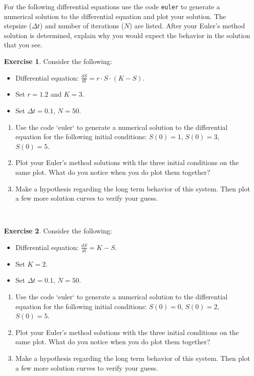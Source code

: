 \documentclass[
]{book}
\theoremstyle{definition}
\theoremstyle{definition}
\theoremstyle{definition}
\newtheorem{exercise}{Exercise}[chapter]
\theoremstyle{remark}
\begin{document}
For the following differential equations use the code \texttt{euler} to generate a numerical solution to the differential equation and plot your solution. The stepsize (\(\Delta t\)) and number of iterations (\(N\)) are listed. After your Euler's method solution is determined, explain why you would expect the behavior in the solution that you see.

\begin{exercise}
\protect\hypertarget{exr:unnamed-chunk-75}{}{\label{exr:unnamed-chunk-75} }Consider the following:

\begin{itemize}
\item Differential equation: $\displaystyle \frac{dS}{dt} = r \cdot S \cdot (K-S) $.
\item Set $r=1.2$ and $K=3$.
\item Set $\Delta t = 0.1$, $N = 50$.
\end{itemize}

\begin{enumerate}[label=\alph*.]
\item Use the code `euler` to generate a numerical solution to the differential equation for the following initial conditions:  $S(0) = 1$, $S(0) = 3$, $S(0) = 5$. 
\item Plot your Euler's method solutions with the three initial conditions on the same plot.  What do you notice when you do plot them together?
\item Make a hypothesis regarding the long term behavior of this system. Then plot a few more solution curves to verify your guess.
\end{enumerate}
\end{exercise}

~

\begin{exercise}
\protect\hypertarget{exr:unnamed-chunk-76}{}{\label{exr:unnamed-chunk-76} }Consider the following:

\begin{itemize}
\item Differential equation: $\displaystyle \frac{dS}{dt} =K-S $.
\item Set $K=2$.
\item Set $\Delta t = 0.1$, $N = 50$.
\end{itemize}

\begin{enumerate}[label=\alph*.]
\item Use the code `euler` to generate a numerical solution to the differential equation for the following initial conditions:  $S(0) = 0$, $S(0) = 2$, $S(0) = 5$. 
\item Plot your Euler's method solutions with the three initial conditions on the same plot.  What do you notice when you do plot them together?
\item Make a hypothesis regarding the long term behavior of this system. Then plot a few more solution curves to verify your guess.
\end{enumerate}
\end{exercise}
\end{document}
